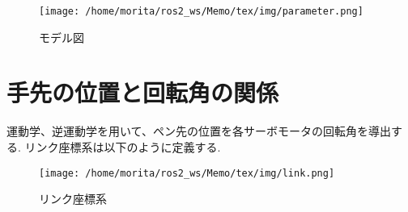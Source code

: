 \documentclass[a4j]{jarticle}			%
\begin{document}
\begin{figure}[htbp]
\begin{center}
\texttt{[image: /home/morita/ros2\_ws/Memo/tex/img/parameter.png]}
\caption{モデル図}
\end{center}
\end{figure}


\section{手先の位置と回転角の関係}

運動学、逆運動学を用いて、ペン先の位置を各サーボモータの回転角を導出する.
リンク座標系は以下のように定義する.
\begin{figure}[htbp]
\begin{center}
\texttt{[image: /home/morita/ros2\_ws/Memo/tex/img/link.png]}
\caption{リンク座標系}
\end{center}
\end{figure}
\end{document}
